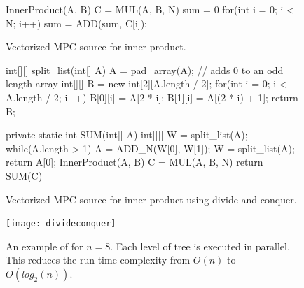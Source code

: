 \begin{figure}[h]
\centering
\begin{minipage}{0.7\textwidth}
\begin{javacode}
  InnerProduct(A, B) {
      C = MUL(A, B, N)
      sum = 0
      for(int i = 0; i < N; i++) {
          sum = ADD(sum, C[i]);
      }
  }
\end{javacode}
\end{minipage}
\caption{Vectorized MPC source for inner product.}
\label{fig:innerproductmpcvec}
\end{figure}

\begin{figure}[h]
\centering
\begin{minipage}{0.7\textwidth}
\begin{javacode}
  int[][]  split_list(int[] A) {
      A = pad_array(A); // adds 0 to an odd length array
      int[][] B = new int[2][A.length / 2];
      for(int i = 0; i < A.length / 2; i++) {
          B[0][i] = A[2 * i];
          B[1][i] = A[(2 * i) + 1];
      }
      return B;
  }

  private static int  SUM(int[] A) {
      int[][] W = split_list(A);
      while(A.length > 1) {
          A = ADD_N(W[0], W[1]);
          W = split_list(A);
      }
      return A[0];
  }
  InnerProduct(A, B) {
      C = MUL(A, B, N)
      return SUM(C)
  }
\end{javacode}
\end{minipage}
\caption{Vectorized MPC source for inner product using divide and conquer.}
\label{fig:innerproductmpcvecdandc}
\end{figure}

\begin{figure}[h]
\centering
\begin{minipage}{0.7\textwidth}
\texttt{[image: divideconquer]}
\end{minipage}
\caption{An example of  for $n = 8$. 
Each level of tree is executed in parallel. This reduces the run time 
complexity from $O(n)$ to $O(log_{2}(n))$.}
\label{fig:treeexample}
\end{figure}

